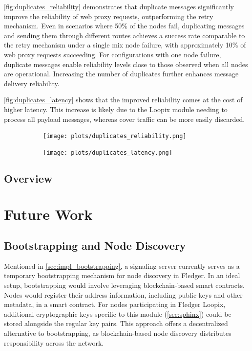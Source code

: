 \documentclass[a4paper,11pt,oneside]{report}
\begin{document}
\autoref{fig:duplicates_reliability} demonstrates that duplicate messages significantly improve the reliability of web proxy requests, outperforming the retry mechanism. Even in scenarios where 50\% of the nodes fail, duplicating messages and sending them through different routes achieves a success rate comparable to the retry mechanism under a single mix node failure, with approximately 10\% of web proxy requests succeeding. For configurations with one node failure, duplicate messages enable reliability levels close to those observed when all nodes are operational. Increasing the number of duplicates further enhances message delivery reliability.

\autoref{fig:duplicates_latency} shows that the improved reliability comes at the cost of higher latency. This increase is likely due to the Loopix module needing to process all payload messages, whereas cover traffic can be more easily discarded.

\begin{figure}[H]
    \centering
    \begin{subfigure}{\textwidth}
        \centering
        \texttt{[image: plots/duplicates\_reliability.png]}
        \caption{}
        \label{fig:duplicates_reliability}
    \end{subfigure}
    \hfill
    \centering
    \begin{subfigure}{\textwidth}
        \centering
        \texttt{[image: plots/duplicates\_latency.png]}
        \caption{}
        \label{fig:duplicates_latency}
    \end{subfigure}
\end{figure}

\section{Overview}

\chapter{Future Work}
\label{sec:future_work}
\section{Bootstrapping and Node Discovery}

Mentioned in \autoref{sec:impl_bootstrapping}, a signaling server currently serves as a temporary bootstrapping mechanism for node discovery in Fledger. In an ideal setup, bootstrapping would involve leveraging blockchain-based smart contracts. Nodes would register their address information, including public keys and other metadata, in a smart contract. For nodes participating in Fledger Loopix, additional cryptographic keys specific to this module (\autoref{sec:sphinx}) could be stored alongside the regular key pairs. This approach offers a decentralized alternative to bootstrapping, as blockchain-based node discovery distributes responsibility across the network.
\end{document}
